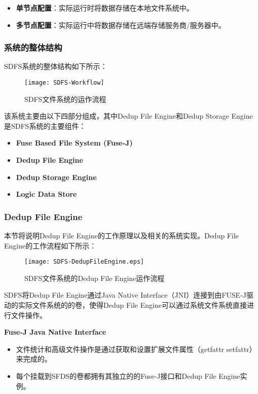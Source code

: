 \begin{itemize}
    \item \textbf{单节点配置}：实际运行时将数据存储在本地文件系统中。
    \item \textbf{多节点配置}：实际运行中将数据存储在远端存储服务商/服务器中。
\end{itemize}

\subsubsection{系统的整体结构}

\par SDFS系统的整体结构如下所示：

\begin{figure}[!htb]
    \small
    \centering
    \texttt{[image: SDFS-Workflow]}
    \caption{SDFS文件系统的运作流程} 
    \label{fig:SDFS-Workflow}
\end{figure}


该系统主要由以下四部分组成，其中Dedup File Engine和Dedup Storage Engine是SDFS系统的主要组件：

\begin{itemize}
    \item \textbf{Fuse Based File System (Fuse-J)}
    \item \textbf{Dedup File Engine}
    \item \textbf{Dedup Storage Engine}
    \item \textbf{Logic Data Store}
\end{itemize}


\subsubsection{Dedup File Engine}
本节将说明Dedup File Engine的工作原理以及相关的系统实现。Dedup File Engine的工作流程如下所示： 

\begin{figure}[!htb]
    \small
    \centering
    \texttt{[image: SDFS-DedupFileEngine.eps]}
    \caption{SDFS文件系统的Dedup File Engine运作流程} 
    \label{fig:SDFS-DedupFileEngine}
\end{figure}

SDFS将Dedup File Engine通过Java Native Interface（JNI）连接到由FUSE-J驱动的实际文件系统的的卷，使得Dedup File Engine可以通过系统文件系统直接进行文件操作。

\textbf{Fuse-J Java Native Interface}

\begin{itemize}
    \item 文件统计和高级文件操作是通过获取和设置扩展文件属性（getfattr setfattr）来完成的。
    \item 每个挂载到SFDS的卷都拥有其独立的的Fuse-J接口和Dedup File Engine实例。
\end{itemize}

